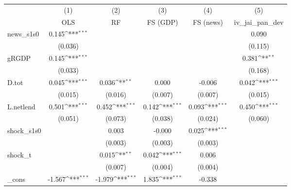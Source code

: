{
\def\sym#1{\ifmmode^{#1}\else\(^{#1}\)\fi}
\begin{tabular}{l*{5}{c}}
\toprule
            &\multicolumn{1}{c}{(1)}&\multicolumn{1}{c}{(2)}&\multicolumn{1}{c}{(3)}&\multicolumn{1}{c}{(4)}&\multicolumn{1}{c}{(5)}\\
            &\multicolumn{1}{c}{OLS}&\multicolumn{1}{c}{RF}&\multicolumn{1}{c}{FS (GDP)}&\multicolumn{1}{c}{FS (news)}&\multicolumn{1}{c}{iv\_jai\_pan\_dev}\\
\midrule
news\_s1s0   &       0.145\sym{***}&                     &                     &                     &       0.090         \\
            &     (0.036)         &                     &                     &                     &     (0.115)         \\
\addlinespace
gRGDP       &       0.145\sym{***}&                     &                     &                     &       0.381\sym{**} \\
            &     (0.033)         &                     &                     &                     &     (0.168)         \\
\addlinespace
D.tot       &       0.045\sym{***}&       0.036\sym{**} &       0.000         &      -0.006         &       0.042\sym{***}\\
            &     (0.015)         &     (0.016)         &     (0.007)         &     (0.007)         &     (0.015)         \\
\addlinespace
L.netlend   &       0.501\sym{***}&       0.452\sym{***}&       0.142\sym{***}&       0.093\sym{***}&       0.450\sym{***}\\
            &     (0.051)         &     (0.073)         &     (0.038)         &     (0.024)         &     (0.060)         \\
\addlinespace
shock\_s1s0  &                     &       0.003         &      -0.000         &       0.025\sym{***}&                     \\
            &                     &     (0.003)         &     (0.003)         &     (0.003)         &                     \\
\addlinespace
shock\_t     &                     &       0.015\sym{**} &       0.042\sym{***}&       0.006         &                     \\
            &                     &     (0.007)         &     (0.004)         &     (0.004)         &                     \\
\addlinespace
\_cons      &      -1.567\sym{***}&      -1.979\sym{***}&       1.835\sym{***}&      -0.338         &                     \\

\end{tabular}}
